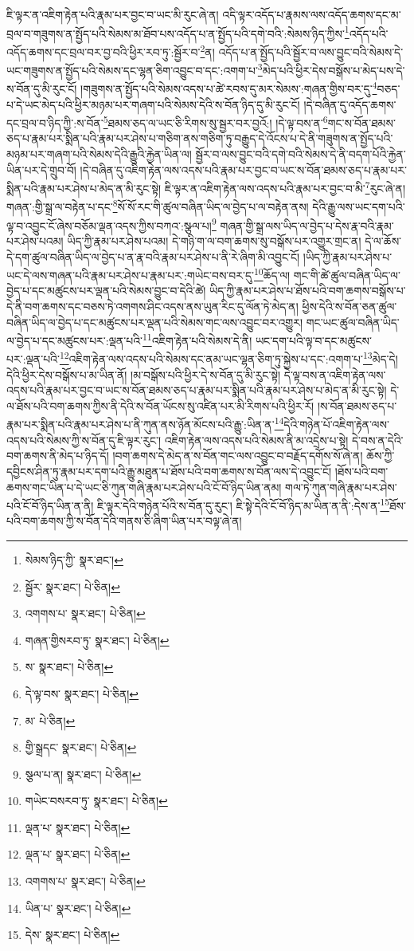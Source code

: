 ཇི་ལྟར་ན་འཇིག་རྟེན་པའི་རྣམ་པར་བྱང་བ་ཡང་མི་རུང་ཞེ་ན། འདི་ལྟར་འདོད་པ་རྣམས་ལས་འདོད་ཆགས་དང་མ་བྲལ་བ་གཟུགས་ན་སྤྱོད་པའི་སེམས་མ་ཐོབ་པས་འདོད་པ་ན་སྤྱོད་པའི་དགེ་བའི་:སེམས་ཉིད་ཀྱིས་\footnote{སེམས་ཉིད་ཀྱི་  སྣར་ཐང་། }འདོད་པའི་འདོད་ཆགས་དང་བྲལ་བར་བྱ་བའི་ཕྱིར་རབ་ཏུ་:སྦྱོར་བ་\footnote{སྦྱོར་  སྣར་ཐང་།  པེ་ཅིན། }ན། འདོད་པ་ན་སྤྱོད་པའི་སྦྱོར་བ་ལས་བྱུང་བའི་སེམས་དེ་ཡང་གཟུགས་ན་སྤྱོད་པའི་སེམས་དང་ལྷན་ཅིག་འབྱུང་བ་དང་:འགག་པ་\footnote{འགགས་པ་  སྣར་ཐང་།  པེ་ཅིན། }མེད་པའི་ཕྱིར་དེས་བསྒོས་པ་མེད་པས་དེ་ས་བོན་དུ་མི་རུང་ངོ། །གཟུགས་ན་སྤྱོད་པའི་སེམས་འདས་པ་ཚེ་རབས་དུ་མར་སེམས་:གཞན་གྱིས་བར་དུ་\footnote{གཞན་གྱིསརབ་ཏུ་  སྣར་ཐང་།  པེ་ཅིན། }བཅད་པ་དེ་ཡང་མེད་པའི་ཕྱིར་མཉམ་པར་གཞག་པའི་སེམས་དེའི་ས་བོན་ཉིད་དུ་མི་རུང་ངོ། །དེ་བཞིན་དུ་འདོད་ཆགས་དང་བྲལ་བ་ཉིད་ཀྱི་:ས་བོན་\footnote{ས་  སྣར་ཐང་།  པེ་ཅིན། }ཐམས་ཅད་ལ་ཡང་ཅི་རིགས་སུ་སྦྱར་བར་བྱའོ:། །དེ་ལྟ་བས་ན་\footnote{དེ་ལྟ་བས་  སྣར་ཐང་།  པེ་ཅིན། }གང་ས་བོན་ཐམས་ཅད་པ་རྣམ་པར་སྨིན་པའི་རྣམ་པར་ཤེས་པ་གཅིག་ནས་གཅིག་ཏུ་བརྒྱུད་དེ་འོངས་པ་དེ་ནི་གཟུགས་ན་སྤྱོད་པའི་མཉམ་པར་གཞག་པའི་སེམས་དེའི་རྒྱུའི་རྐྱེན་ཡིན་ལ། སྦྱོར་བ་ལས་བྱུང་བའི་དགེ་བའི་སེམས་དེ་ནི་བདག་པོའི་རྐྱེན་ཡིན་པར་དེ་གྲུབ་བོ། །དེ་བཞིན་དུ་འཇིག་རྟེན་ལས་འདས་པའི་རྣམ་པར་བྱང་བ་ཡང་ས་བོན་ཐམས་ཅད་པ་རྣམ་པར་སྨིན་པའི་རྣམ་པར་ཤེས་པ་མེད་ན་མི་རུང་སྟེ། ཇི་ལྟར་ན་འཇིག་རྟེན་ལས་འདས་པའི་རྣམ་པར་བྱང་བ་མི་\footnote{མ་  པེ་ཅིན། }རུང་ཞེ་ན། གཞན་:གྱི་སྒྲ་ལ་བརྟེན་པ་དང་\footnote{གྱི་སྒྲདང་  སྣར་ཐང་།  པེ་ཅིན། }སོ་སོ་རང་གི་ཚུལ་བཞིན་ཡིད་ལ་བྱེད་པ་ལ་བརྟེན་ནས། དེའི་རྒྱུ་ལས་ཡང་དག་པའི་ལྟ་བ་འབྱུང་ངོ་ཞེས་བཅོམ་ལྡན་འདས་ཀྱིས་བཀའ་:སྩལ་པ།\footnote{སྩལ་པ་ན།  སྣར་ཐང་།  པེ་ཅིན། } གཞན་གྱི་སྒྲ་ལས་ཡིད་ལ་བྱེད་པ་དེས་རྣ་བའི་རྣམ་པར་ཤེས་པའམ། ཡིད་ཀྱི་རྣམ་པར་ཤེས་པའམ། དེ་གཉི་ག་ལ་བག་ཆགས་སུ་བསྒོས་པར་འགྱུར་གྲང་ན། དེ་ལ་ཆོས་དེ་དག་ཚུལ་བཞིན་ཡིད་ལ་བྱེད་པ་ན་རྣ་བའི་རྣམ་པར་ཤེས་པ་ནི་རེ་ཞིག་མི་འབྱུང་ངོ། །ཡིད་ཀྱི་རྣམ་པར་ཤེས་པ་ཡང་དེ་ལས་གཞན་པའི་རྣམ་པར་ཤེས་པ་རྣམ་པར་:གཡེང་བས་བར་དུ་\footnote{གཡེང་བསརབ་ཏུ་  སྣར་ཐང་།  པེ་ཅིན། }ཆོད་ལ། གང་གི་ཚེ་ཚུལ་བཞིན་ཡིད་ལ་བྱེད་པ་དང་མཚུངས་པར་ལྡན་པའི་སེམས་བྱུང་བ་དེའི་ཚེ། ཡིད་ཀྱི་རྣམ་པར་ཤེས་པ་ཐོས་པའི་བག་ཆགས་བསྒོས་པ་དེ་ནི་བག་ཆགས་དང་བཅས་ཏེ་འགགས་ཤིང་འདས་ནས་ཡུན་རིང་དུ་ལོན་ཏེ་མེད་ན། ཕྱིས་དེའི་ས་བོན་ཅན་ཚུལ་བཞིན་ཡིད་ལ་བྱེད་པ་དང་མཚུངས་པར་ལྡན་པའི་སེམས་གང་ལས་འབྱུང་བར་འགྱུར། གང་ཡང་ཚུལ་བཞིན་ཡིད་ལ་བྱེད་པ་དང་མཚུངས་པར་:ལྡན་པའི་\footnote{ལྡན་པ་  སྣར་ཐང་།  པེ་ཅིན། }འཇིག་རྟེན་པའི་སེམས་དེ་ནི། ཡང་དག་པའི་ལྟ་བ་དང་མཚུངས་པར་:ལྡན་པའི་\footnote{ལྡན་པ་  སྣར་ཐང་།  པེ་ཅིན། }འཇིག་རྟེན་ལས་འདས་པའི་སེམས་དང་ནམ་ཡང་ལྷན་ཅིག་ཏུ་སྐྱེས་པ་དང་:འགག་པ་\footnote{འགགས་པ་  སྣར་ཐང་།  པེ་ཅིན། }མེད་དེ། དེའི་ཕྱིར་དེས་བསྒོས་པ་མ་ཡིན་ནོ། །མ་བསྒོས་པའི་ཕྱིར་དེ་ས་བོན་དུ་མི་རུང་སྟེ། དེ་ལྟ་བས་ན་འཇིག་རྟེན་ལས་འདས་པའི་རྣམ་པར་བྱང་བ་ཡང་ས་བོན་ཐམས་ཅད་པ་རྣམ་པར་སྨིན་པའི་རྣམ་པར་ཤེས་པ་མེད་ན་མི་རུང་སྟེ། དེ་ལ་ཐོས་པའི་བག་ཆགས་ཀྱིས་ནི་དེའི་ས་བོན་ཡོངས་སུ་འཛིན་པར་མི་རིགས་པའི་ཕྱིར་རོ། །ས་བོན་ཐམས་ཅད་པ་རྣམ་པར་སྨིན་པའི་རྣམ་པར་ཤེས་པ་ནི་ཀུན་ནས་ཉོན་མོངས་པའི་རྒྱུ་:ཡིན་ན་\footnote{ཡིན་པ་  སྣར་ཐང་།  པེ་ཅིན། }དེའི་གཉེན་པོ་འཇིག་རྟེན་ལས་འདས་པའི་སེམས་ཀྱི་ས་བོན་དུ་ཇི་ལྟར་རུང་། འཇིག་རྟེན་ལས་འདས་པའི་སེམས་ནི་མ་འདྲེས་པ་སྟེ། དེ་བས་ན་དེའི་བག་ཆགས་ནི་མེད་པ་ཉིད་དོ། །བག་ཆགས་དེ་མེད་ན་ས་བོན་གང་ལས་འབྱུང་བ་བརྗོད་དགོས་སོ་ཞེ་ན། ཆོས་ཀྱི་དབྱིངས་ཤིན་ཏུ་རྣམ་པར་དག་པའི་རྒྱུ་མཐུན་པ་ཐོས་པའི་བག་ཆགས་ས་བོན་ལས་དེ་འབྱུང་ངོ། །ཐོས་པའི་བག་ཆགས་གང་ཡིན་པ་དེ་ཡང་ཅི་ཀུན་གཞི་རྣམ་པར་ཤེས་པའི་ངོ་བོ་ཉིད་ཡིན་ནམ། གལ་ཏེ་ཀུན་གཞི་རྣམ་པར་ཤེས་པའི་ངོ་བོ་ཉིད་ཡིན་ན་ནི། ཇི་ལྟར་དེའི་གཉེན་པོའི་ས་བོན་དུ་རུང་། ཇི་སྟེ་དེའི་ངོ་བོ་ཉིད་མ་ཡིན་ན་ནི་:དེས་ན་\footnote{དེས་  སྣར་ཐང་།  པེ་ཅིན། }ཐོས་པའི་བག་ཆགས་ཀྱི་ས་བོན་དེའི་གནས་ཅི་ཞིག་ཡིན་པར་བལྟ་ཞེ་ན། 